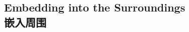 % 
% 
% 
% 


\subsection{Embedding into the Surroundings\\嵌入周围}\label{subsec:surroundings}









